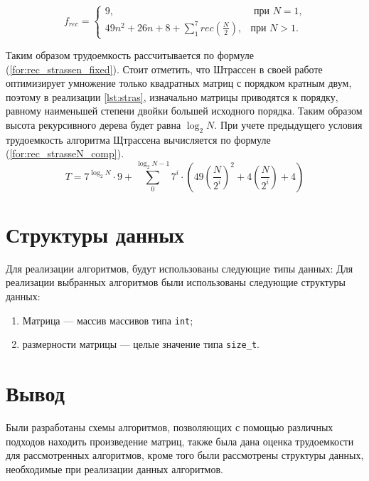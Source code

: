 \begin{equation}
	\label{for:rec_strassen_fixed}
	f_{rec} =
	\begin{cases}
		9, & \text{ при $N = 1$,}\\
		49n^2+26n+8 + \sum_{1}^{7}{rec(\frac{N}{2})}, & \text{при $N> 1$.}
	\end{cases}
\end{equation}

Таким образом трудоемкость рассчитывается по формуле  (\ref{for:rec_strassen_fixed}). Стоит отметить, что Штрассен в своей работе оптимизирует умножение только квадратных матриц с порядком кратным двум, поэтому в реализации \ref{lst:stras}, изначально матрицы приводятся к порядку, равному наименьшей степени двойки большей исходного порядка. Таким образом высота рекурсивного дерева будет равна $\log_{2}{N}$. При учете предыдущего условия трудоемкость алгоритма Щтрассена вычисляется по формуле (\ref{for:rec_strasseN_comp}).
\begin{equation}
	\label{for:rec_strasseN_comp}
	T = 7^{\log_{2}{N}}\cdot 9+ \sum_{0}^{\log_{2}{N} - 1}{7^{i} \cdot (49(\frac{N}{2^i})^2 + 4(\frac{N}{2^i})+ 4)}
\end{equation}






\section{Структуры данных}

Для реализации алгоритмов, будут использованы следующие типы данных:
Для реализации выбранных алгоритмов были использованы следующие структуры данных:
\begin{enumerate}
	\item Матрица --- массив массивов типа \texttt{int};
	\item размерности матрицы --- целые значение типа \texttt{size\_t}.
\end{enumerate}





\section*{Вывод}

Были разработаны схемы алгоритмов, позволяющих с помощью различных подходов находить произведение матриц, также была дана оценка трудоемкости для рассмотренных алгоритмов, кроме того были рассмотрены структуры данных, необходимые при реализации данных алгоритмов.  


